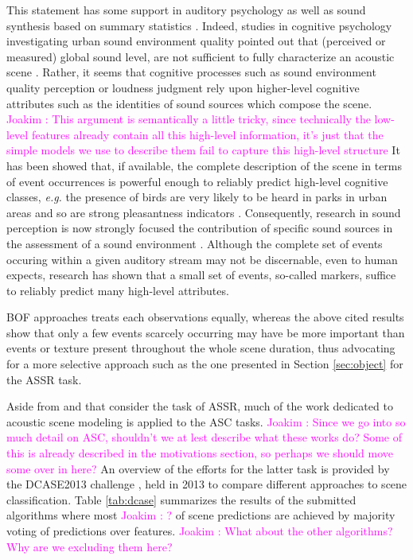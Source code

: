 \documentclass[journal]{IEEEtran}
\newcommand{\ja}[1]{\textcolor{magenta}{Joakim : #1}}
\begin{document}
This statement has some support in auditory psychology as well as sound synthesis based on summary statistics \cite{mcdermott2013summary}. Indeed, studies in cognitive psychology investigating urban sound environment quality pointed out that (perceived or measured) global sound level, are not sufficient to fully characterize an acoustic scene \cite{guyot2005urban,kang2006urban}. Rather, it seems that cognitive processes such as sound environment quality perception \cite{dubois2006cognitive} or loudness judgment \cite{kuwano_memory_2003} rely upon higher-level cognitive attributes such as the identities of sound sources which compose the scene. \ja{This argument is semantically a little tricky, since technically the low-level features already contain all this high-level information, it's just that the simple models we use to describe them fail to capture this high-level structure} It has been showed that, if available, the complete description of the scene in terms of event occurrences is powerful enough to reliably predict high-level cognitive classes, \textit{e.g.} the presence of birds are very likely to be heard in parks in urban areas and so are strong pleasantness indicators \cite{lafayPartI}. Consequently, research in sound perception is now strongly focused the contribution of specific sound sources in the assessment of a sound environment \cite{ricciardi2015sound,lavandier2006contribution}. Although the complete set of events occuring within a given auditory stream may not be discernable, even to human expects, research has shown that a small set of events, so-called markers, suffice to reliably predict many high-level attributes.

BOF approaches treats each observations equally, whereas the above cited results show that only a few events scarcely occurring may have be more important than events or texture present throughout the whole scene duration, thus advocating for a more selective approach such as the one presented in Section \ref{sec:object} for the ASSR task.


Aside from \cite{aucouturier2007bag} and \cite{lagrange:hal-01082501} that consider the task of ASSR, much of the work dedicated to acoustic scene modeling is applied to the ASC tasks. \ja{Since we go into so much detail on ASC, shouldn't we at lest describe what these works do? Some of this is already described in the motivations section, so perhaps we should move some over in here?}
An overview of the efforts for the latter task is provided by the DCASE2013 challenge \cite{barchiesi2015acoustic}, held in 2013 to compare different approaches to scene classification. Table \ref{tab:dcase} summarizes the results of the submitted algorithms where most \ja{?} of scene predictions are achieved by majority voting of predictions over features. \ja{What about the other algorithms? Why are we excluding them here?}
\end{document}
